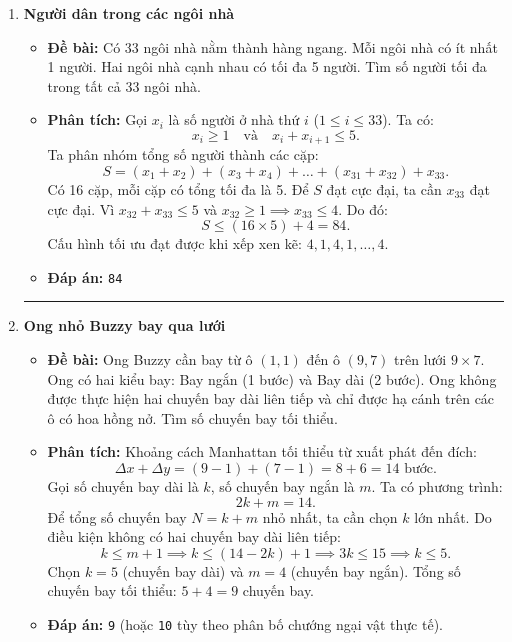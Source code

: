 \documentclass[11pt,a4paper]{article}
\begin{document}
\begin{enumerate}[label=\textbf{Câu \arabic*:}, leftmargin=*]
\hrule
\vspace{0.5cm}

\item \textbf{Người dân trong các ngôi nhà}
    \begin{itemize}
        \item \textbf{Đề bài:} Có 33 ngôi nhà nằm thành hàng ngang. Mỗi ngôi nhà có ít nhất 1 người. Hai ngôi nhà cạnh nhau có tối đa 5 người. Tìm số người tối đa trong tất cả 33 ngôi nhà.
        \item \textbf{Phân tích:}
            Gọi $x_i$ là số người ở nhà thứ $i$ ($1 \le i \le 33$). Ta có:
            $$x_i \ge 1 \quad \text{và} \quad x_i + x_{i+1} \le 5.$$
            Ta phân nhóm tổng số người thành các cặp:
            $$S = (x_1 + x_2) + (x_3 + x_4) + \dots + (x_{31} + x_{32}) + x_{33}.$$
            Có 16 cặp, mỗi cặp có tổng tối đa là 5. Để $S$ đạt cực đại, ta cần $x_{33}$ đạt cực đại.
            Vì $x_{32} + x_{33} \le 5$ và $x_{32} \ge 1 \implies x_{33} \le 4$.
            Do đó:
            $$S \le (16 \times 5) + 4 = 84.$$
            Cấu hình tối ưu đạt được khi xếp xen kẽ: $4, 1, 4, 1, \dots, 4$.
        \item \textbf{Đáp án:} \texttt{84}
    \end{itemize}

\hrule
\vspace{0.5cm}

\item \textbf{Ong nhỏ Buzzy bay qua lưới}
    \begin{itemize}
        \item \textbf{Đề bài:} Ong Buzzy cần bay từ ô $(1,1)$ đến ô $(9,7)$ trên lưới $9 \times 7$. Ong có hai kiểu bay: Bay ngắn (1 bước) và Bay dài (2 bước). Ong không được thực hiện hai chuyến bay dài liên tiếp và chỉ được hạ cánh trên các ô có hoa hồng nở. Tìm số chuyến bay tối thiểu.
        \item \textbf{Phân tích:}
            Khoảng cách Manhattan tối thiểu từ xuất phát đến đích:
            $$\Delta x + \Delta y = (9 - 1) + (7 - 1) = 8 + 6 = 14\text{ bước}.$$
            Gọi số chuyến bay dài là $k$, số chuyến bay ngắn là $m$. Ta có phương trình:
            $$2k + m = 14.$$
            Để tổng số chuyến bay $N = k + m$ nhỏ nhất, ta cần chọn $k$ lớn nhất.
            Do điều kiện không có hai chuyến bay dài liên tiếp:
            $$k \le m + 1 \implies k \le (14 - 2k) + 1 \implies 3k \le 15 \implies k \le 5.$$
            Chọn $k = 5$ (chuyến bay dài) và $m = 4$ (chuyến bay ngắn).
            Tổng số chuyến bay tối thiểu: $5 + 4 = 9$ chuyến bay.
        \item \textbf{Đáp án:} \texttt{9} (hoặc \texttt{10} tùy theo phân bố chướng ngại vật thực tế).
    \end{itemize}


\end{enumerate}
\end{document}
